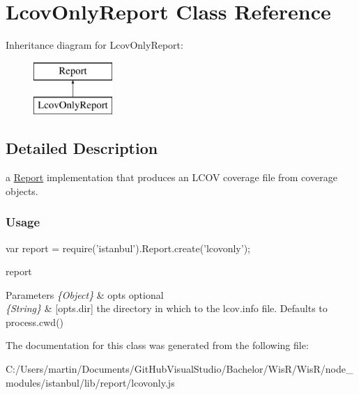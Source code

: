 \hypertarget{class_lcov_only_report}{}\section{Lcov\+Only\+Report Class Reference}
\label{class_lcov_only_report}
Inheritance diagram for Lcov\+Only\+Report\+:\begin{figure}[H]
\begin{center}
\leavevmode
\includegraphics[height=2.000000cm]{class_lcov_only_report}
\end{center}
\end{figure}


\subsection{Detailed Description}
a {\ttfamily \hyperlink{class_report}{Report}} implementation that produces an L\+C\+O\+V coverage file from coverage objects.

\subsubsection*{Usage }

\begin{DoxyVerb} var report = require('istanbul').Report.create('lcovonly');
\end{DoxyVerb}


report  
\begin{DoxyParams}{Parameters}
{\em \{\+Object\}} & opts optional \\
\hline
{\em \{\+String\}} & \mbox{[}opts.\+dir\mbox{]} the directory in which to the {\ttfamily lcov.\+info} file. Defaults to {\ttfamily process.\+cwd()} \\
\hline
\end{DoxyParams}


The documentation for this class was generated from the following file\+:\begin{DoxyCompactItemize}
\item 
C\+:/\+Users/martin/\+Documents/\+Git\+Hub\+Visual\+Studio/\+Bachelor/\+Wis\+R/\+Wis\+R/node\+\_\+modules/istanbul/lib/report/lcovonly.\+js\end{DoxyCompactItemize}
